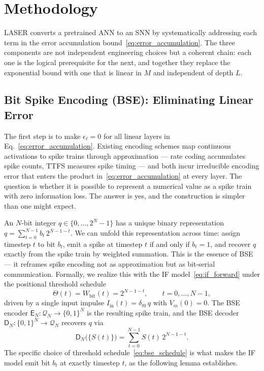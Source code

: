 \documentclass{article}
\theoremstyle{plain}
\theoremstyle{definition}
\theoremstyle{remark}
\begin{document}
\section{Methodology}
\label{sec:methodology}

LASER converts a pretrained ANN to an SNN by systematically addressing each term in
the error accumulation bound~\eqref{eq:error_accumulation}. The three components
are not independent engineering choices but a coherent chain: each one is the logical
prerequisite for the next, and together they replace the exponential bound with one
that is linear in $M$ and independent of depth $L$.

\subsection{Bit Spike Encoding (BSE): Eliminating Linear Error}
\label{subsec:bse}

The first step is to make $\epsilon_\ell = 0$ for all linear layers in
Eq.~\eqref{eq:error_accumulation}. Existing encoding schemes map continuous
activations to spike trains through approximation — rate coding accumulates spike
counts, TTFS measures spike timing — and both incur irreducible encoding error that
enters the product in~\eqref{eq:error_accumulation} at every layer. The question is
whether it is possible to represent a numerical value as a spike train with zero
information loss. The answer is yes, and the construction is simpler than one might
expect.

An $N$-bit integer $q \in \{0, \dots, 2^N-1\}$ has a unique binary representation
$q = \sum_{t=0}^{N-1} b_t\,2^{N-1-t}$. We can unfold this representation across
time: assign timestep $t$ to bit $b_t$, emit a spike at timestep $t$ if and only if
$b_t = 1$, and recover $q$ exactly from the spike train by weighted summation. This
is the essence of BSE — it reframes spike encoding not as approximation but as
bit-serial communication.
%
Formally, we realize this with the IF model~\eqref{eq:if_forward} under the
positional threshold schedule
\begin{equation}
\label{eq:bse_schedule}
\Theta(t) = W_{\mathrm{bit}}(t) = 2^{N-1-t}, \qquad t = 0, \dots, N-1,
\end{equation}
driven by a single input impulse $I_{\mathrm{in}}(t) = \delta_{t0}\,q$ with
$V_m(0) = 0$. The BSE encoder $\mathsf{E}_N : \mathcal{Q}_N \to \{0,1\}^N$ is the
resulting spike train, and the BSE decoder $\mathsf{D}_N : \{0,1\}^N \to
\mathcal{Q}_N$ recovers $q$ via
\begin{equation}
\label{eq:bse_decoder}
\mathsf{D}_N\!\big(\{S(t)\}\big) = \sum_{t=0}^{N-1} S(t)\,2^{N-1-t}.
\end{equation}
The specific choice of threshold schedule~\eqref{eq:bse_schedule} is what makes the
IF model emit bit $b_t$ at exactly timestep $t$, as the following lemma establishes.
\end{document}
